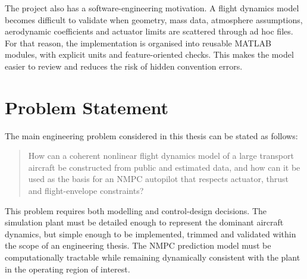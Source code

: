 The project also has a software-engineering motivation. A flight dynamics model becomes difficult to validate when geometry, mass data, atmosphere assumptions, aerodynamic coefficients and actuator limits are scattered through ad hoc files. For that reason, the implementation is organised into reusable MATLAB modules, with explicit units and feature-oriented checks. This makes the model easier to review and reduces the risk of hidden convention errors.

\section{Problem Statement}

The main engineering problem considered in this thesis can be stated as follows:

\begin{quote}
How can a coherent nonlinear flight dynamics model of a large transport aircraft be constructed from public and estimated data, and how can it be used as the basis for an NMPC autopilot that respects actuator, thrust and flight-envelope constraints?
\end{quote}

This problem requires both modelling and control-design decisions. The simulation plant must be detailed enough to represent the dominant aircraft dynamics, but simple enough to be implemented, trimmed and validated within the scope of an engineering thesis. The NMPC prediction model must be computationally tractable while remaining dynamically consistent with the plant in the operating region of interest.
